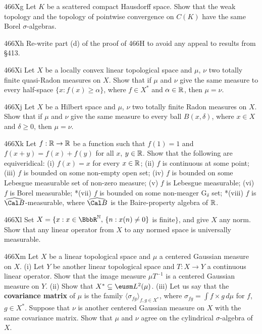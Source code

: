 {\spheader 466Xg Let $K$ be a scattered compact Hausdorff space.   Show that
the weak topology and the topology of pointwise convergence on $C(K)$ have
the same Borel $\sigma$-algebras.

\spheader 466Xh Re-write part (d) of the proof of 466H to avoid any
appeal to results from \S413.

\spheader 466Xi Let $X$ be a locally convex linear topological space and
$\mu$, $\nu$ two totally finite quasi-Radon measures on $X$.   Show that
if $\mu$ and $\nu$ give the same measure to every half-space
$\{x:f(x)\ge\alpha\}$, where $f\in X^*$ and $\alpha\in\Bbb R$, then
$\mu=\nu$.

\spheader 466Xj Let $X$ be a Hilbert space and $\mu$, $\nu$ two totally
finite Radon measures on $X$.   Show that if $\mu$ and $\nu$ give the
same measure to every ball $B(x,\delta)$, where $x\in X$ and
$\delta\ge 0$, then $\mu=\nu$.   

\spheader 466Xk Let $f:\Bbb R\to\Bbb R$ be a function such that $f(1)=1$
and $f(x+y)=f(x)+f(y)$ for all $x$, $y\in\Bbb R$.    Show that the
following are equiveridical:  (i) $f(x)=x$ for every $x\in\Bbb R$;  (ii)
$f$ is continuous at some point;  (iii) $f$ is bounded on some non-empty
open set;  (iv) $f$ is bounded on some Lebesgue measurable set of
non-zero measure;  (v) $f$ is Lebesgue measurable;  (vi) $f$ is Borel
measurable;  *(vii) $f$ is bounded on some non-meager G$_{\delta}$
set;  *(viii) $f$ is $\widehat{\Cal B}$-measurable, where
$\widehat{\Cal B}$ is the Baire-property algebra of $\Bbb R$.

\spheader 466Xl Set $X=\{x:x\in\BbbR^{\Bbb N},\,\{n:x(n)\ne 0\}$ is
finite$\}$, and give $X$ any norm.   Show that any linear operator from
$X$ to any normed space is universally measurable.

\spheader 466Xm
Let $X$ be a linear topological space and $\mu$ a
centered Gaussian measure on $X$.
(i) Let $Y$ be another linear topological space and $T:X\to Y$ a
continuous linear operator.
Show that the image measure $\mu T^{-1}$ is a centered Gaussian measure on
$Y$.
(ii) Show that $X^*\subseteq\eusm L^2(\mu)$.
(iii) Let us say that the {\bf covariance matrix} of
$\mu$ is the family $\langle\sigma_{fg}\rangle_{f,g\in X^*}$, where
$\sigma_{fg}=\int f\times g\,d\mu$ for $f$, $g\in X^*$.   Suppose that
$\nu$ is
another centered Gaussian measure on $X$ with the same covariance matrix.
Show that $\mu$ and $\nu$ agree on the cylindrical $\sigma$-algebra of $X$.

}
